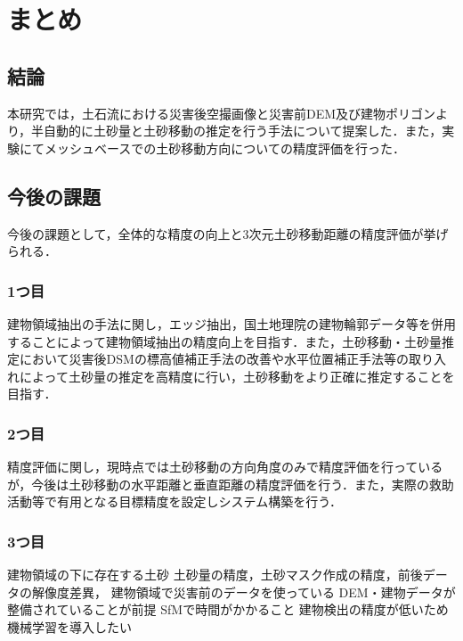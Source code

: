 \chapter{まとめ}
  \section{結論}
    本研究では，土石流における災害後空撮画像と災害前DEM及び建物ポリゴンより，半自動的に土砂量と土砂移動の推定を行う手法について提案した．また，実験にてメッシュベースでの土砂移動方向についての精度評価を行った．



  \section{今後の課題}
    今後の課題として，全体的な精度の向上と3次元土砂移動距離の精度評価が挙げられる．


    \subsection*{1つ目}
      建物領域抽出の手法に関し，エッジ抽出，国土地理院の建物輪郭データ等を併用することによって建物領域抽出の精度向上を目指す．また，土砂移動・土砂量推定において災害後DSMの標高値補正手法の改善や水平位置補正手法\cite{土砂量解析1}等の取り入れによって土砂量の推定を高精度に行い，土砂移動をより正確に推定することを目指す．


    \subsection*{2つ目}
      精度評価に関し，現時点では土砂移動の方向角度のみで精度評価を行っているが，今後は土砂移動の水平距離と垂直距離の精度評価を行う．また，実際の救助活動等で有用となる目標精度を設定しシステム構築を行う．

      
    \subsection*{3つ目}
      建物領域の下に存在する土砂
      土砂量の精度，土砂マスク作成の精度，前後データの解像度差異，
      建物領域で災害前のデータを使っている
      DEM・建物データが整備されていることが前提
      SfMで時間がかかること
      建物検出の精度が低いため機械学習を導入したい
